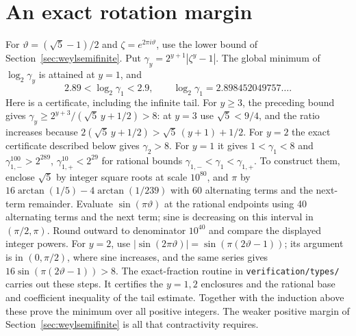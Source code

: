\section{An exact rotation margin}\label{app:rotationcertificate}
For $\vartheta=(\sqrt5-1)/2$ and $\zeta=e^{2\pi i\vartheta}$, use the lower bound of Section~\ref{sec:weylsemifinite}.
Put $\gamma_y=2^{y+1}|\zeta^y-1|$. The global minimum of $\log_2 \gamma_y$ is attained at $y=1$, and
\begin{equation}\label{eq:margin}
 2.89<\log_2 \gamma_1<2.9,\qquad
 \log_2 \gamma_1=2.898452049757\ldots.
\end{equation}
Here is a certificate, including the infinite tail. For $y\geq3$, the preceding bound gives $\gamma_y\geq2^{y+3}/(\sqrt5\,y+1/2)>8$: at $y=3$ use $\sqrt5<9/4$, and the ratio increases because $2(\sqrt5\,y+1/2)>\sqrt5\,(y+1)+1/2$. For $y=2$ the exact certificate described below gives $\gamma_2>8$. For $y=1$ it gives $1<\gamma_1<8$ and $\gamma_{1,-}^{100}>2^{289}$, $\gamma_{1,+}^{10}<2^{29}$ for rational bounds $\gamma_{1,-}<\gamma_1<\gamma_{1,+}$. To construct them, enclose $\sqrt5$ by integer square roots at scale $10^{80}$, and $\pi$ by $16\arctan(1/5)-4\arctan(1/239)$ with 60 alternating terms and the next-term remainder. Evaluate $\sin(\pi\vartheta)$ at the rational endpoints using 40 alternating terms and the next term; sine is decreasing on this interval in $(\pi/2,\pi)$. Round outward to denominator $10^{40}$ and compare the displayed integer powers. For $y=2$, use $|\sin(2\pi\vartheta)|=\sin(\pi(2\vartheta-1))$; its argument is in $(0,\pi/2)$, where sine increases, and the same series gives $16\sin(\pi(2\vartheta-1))>8$. The exact-fraction routine in \texttt{verification/types/} carries out these steps. It certifies the $y=1,2$ enclosures and the rational base and coefficient inequality of the tail estimate. Together with the induction above these prove the minimum over all positive integers. The weaker positive margin of Section~\ref{sec:weylsemifinite} is all that contractivity requires.
